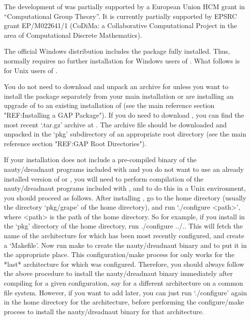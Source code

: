 The development of {\GRAPE} was partially supported by a European
Union HCM grant in ``Computational Group Theory''. It is currently
partially supported by EPSRC grant EP/M022641/1 (CoDiMa: a Collaborative
Computational Project in the area of Computational Discrete Mathematics).



The official {\GAP} Windows distribution includes the {\GRAPE} package
fully installed.  Thus, {\GRAPE} normally requires no further installation
for Windows users of {\GAP}. What follows is for Unix users of {\GRAPE}.

You do not need to download and unpack an archive for {\GRAPE} unless you
want to install the package separately from your main {\GAP} installation
or are installing an upgrade of {\GRAPE} to an existing installation
of {\GAP} (see the main {\GAP} reference section "REF:Installing a GAP
Package").  If you do need to download {\GRAPE}, you can find the most
recent `.tar.gz' archive at .
The archive file should be downloaded and unpacked in the `pkg'
subdirectory of an appropriate {\GAP} root directory (see the main {\GAP}
reference section "REF:GAP Root Directories").

If your {\GRAPE} installation does not include a pre-compiled binary of 
the nauty/dreadnaut programs included with {\GRAPE} and you do not want 
to use an already installed version of {\nauty} or {\bliss}, you will 
need to perform compilation of the nauty/dreadnaut programs included with
{\GRAPE}, and to do this in a Unix environment, you should proceed as
follows.  After installing {\GAP}, go to the {\GRAPE} home directory
(usually the directory `pkg/grape' of the {\GAP} home directory),
and run `./configure <path>', where <path> is the path of the {\GAP}
home directory.  So for example, if you install {\GRAPE} in the `pkg'
directory of the {\GAP} home directory, run 
\begintt 
./configure ../..
\endtt 
This will fetch the name of the architecture for which {\GAP}
has been most recently configured, and create a `Makefile'. Now run
\begintt 
make 
\endtt 
to create the nauty/dreadnaut binary and to put
it in the appropriate place.  This configuration/make process for
{\GRAPE} only works for the *last* architecture for which {\GAP} was
configured. Therefore, you should always follow the above procedure to
install the nauty/dreadnaut binary immediately after compiling {\GAP}
for a given configuration, say for a different architecture on a common
file system. However, if you want to add {\GRAPE} later, you can just run
`./configure' again in the {\GAP} home directory for the architecture,
before performing the {\GRAPE} configure/make process to install the
nauty/dreadnaut binary for that architecture.

